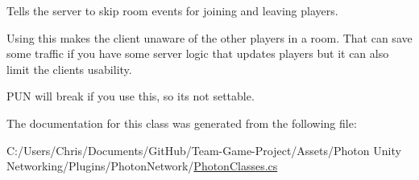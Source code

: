 Tells the server to skip room events for joining and leaving players. 

Using this makes the client unaware of the other players in a room. That can save some traffic if you have some server logic that updates players but it can also limit the client\textquotesingle{}s usability.

P\+UN will break if you use this, so it\textquotesingle{}s not settable. 

The documentation for this class was generated from the following file\+:\begin{DoxyCompactItemize}
\item 
C\+:/\+Users/\+Chris/\+Documents/\+Git\+Hub/\+Team-\/\+Game-\/\+Project/\+Assets/\+Photon Unity Networking/\+Plugins/\+Photon\+Network/\hyperlink{_photon_classes_8cs}{Photon\+Classes.\+cs}\end{DoxyCompactItemize}
